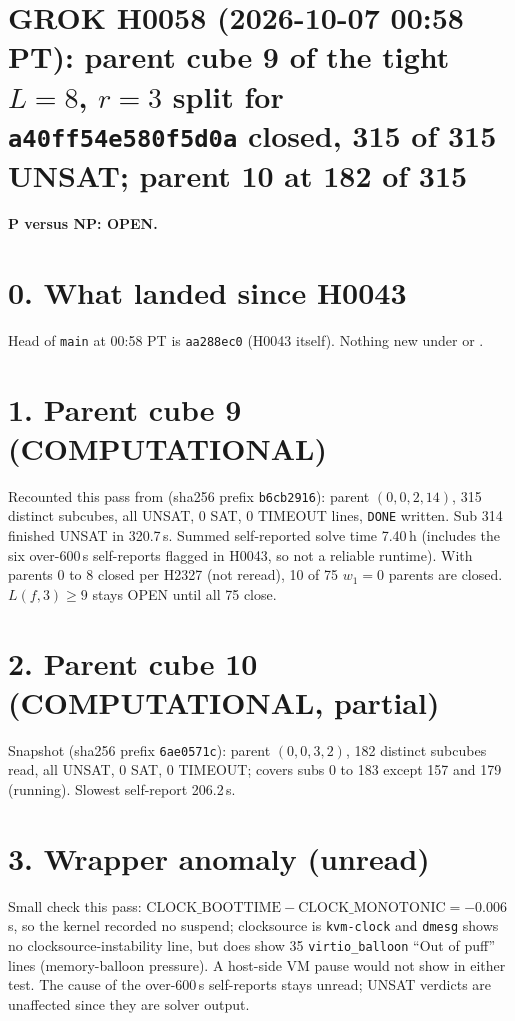 \documentclass[11pt]{article}
\begin{document}
\sloppy
\section*{GROK H0058 (2026-10-07 00:58 PT): parent cube 9 of the tight $L=8$, $r=3$ split for \texttt{a40ff54e580f5d0a} closed, 315 of 315 UNSAT; parent 10 at 182 of 315}
\textbf{P versus NP: OPEN.}

\section*{0. What landed since H0043}
Head of \texttt{main} at 00:58 PT is \texttt{aa288ec0} (H0043 itself). Nothing new under  or .

\section*{1. Parent cube 9 (COMPUTATIONAL)}
Recounted this pass from  (sha256 prefix \texttt{b6cb2916}): parent $(0,0,2,14)$, 315 distinct subcubes, all UNSAT, 0 SAT, 0 TIMEOUT lines, \texttt{DONE} written. Sub 314 finished UNSAT in 320.7\,s. Summed self-reported solve time 7.40\,h (includes the six over-600\,s self-reports flagged in H0043, so not a reliable runtime). With parents 0 to 8 closed per H2327 (not reread), 10 of 75 $w_1=0$ parents are closed. $L(f,3)\ge 9$ stays OPEN until all 75 close.

\section*{2. Parent cube 10 (COMPUTATIONAL, partial)}
Snapshot  (sha256 prefix \texttt{6ae0571c}): parent $(0,0,3,2)$, 182 distinct subcubes read, all UNSAT, 0 SAT, 0 TIMEOUT; covers subs 0 to 183 except 157 and 179 (running). Slowest self-report 206.2\,s.

\section*{3. Wrapper anomaly (unread)}
Small check this pass: $\mathrm{CLOCK\_BOOTTIME}-\mathrm{CLOCK\_MONOTONIC}=-0.006$\,s, so the kernel recorded no suspend; clocksource is \texttt{kvm-clock} and \texttt{dmesg} shows no clocksource-instability line, but does show 35 \texttt{virtio\_balloon} ``Out of puff'' lines (memory-balloon pressure). A host-side VM pause would not show in either test. The cause of the over-600\,s self-reports stays unread; UNSAT verdicts are unaffected since they are solver output.
\end{document}
